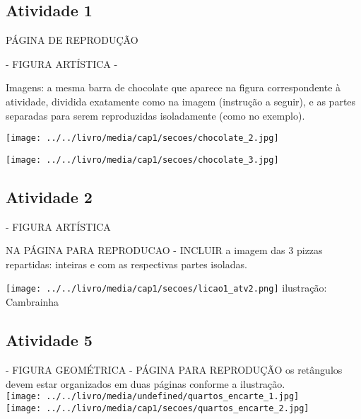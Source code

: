 \documentclass{book}
\begin{document}
\begin{multicols}{2}



\subsection{Atividade 1}


  \begin{imagem*}[breakable]{}{}
    PÁGINA DE REPRODUÇÃO

    - FIGURA ARTÍSTICA -

    Imagens: a mesma barra de chocolate que aparece na figura correspondente à atividade, dividida exatamente como na imagem (instrução a seguir), e as partes separadas para serem reproduzidas isoladamente (como no exemplo).

        \texttt{[image: ../../livro/media/cap1/secoes/chocolate\_2.jpg]}

        \texttt{[image: ../../livro/media/cap1/secoes/chocolate\_3.jpg]}
  \end{imagem*}


\subsection{Atividade 2}

  \begin{imagem*}[breakable]{}{}      - FIGURA ARTÍSTICA
    \begin{nota*}[breakable]{}{}       NA PÁGINA PARA REPRODUCAO - INCLUIR a imagem das 3 pizzas repartidas: inteiras e com as respectivas partes isoladas.
    \end{nota*}

        \texttt{[image: ../../livro/media/cap1/secoes/licao1\_atv2.png]}
    ilustração: Cambrainha

  \end{imagem*}

\subsection{Atividade 5}

  \begin{imagem*}[breakable]{}{}
    \begin{nota*}[breakable]{}{}       - FIGURA GEOMÉTRICA - PÁGINA PARA REPRODUÇÃO
      os retângulos devem estar organizados em duas páginas conforme a ilustração.
\\
      \texttt{[image: ../../livro/media/undefined/quartos\_encarte\_1.jpg]}
\\
      \texttt{[image: ../../livro/media/cap1/secoes/quartos\_encarte\_2.jpg]}
    \end{nota*}
  \end{imagem*}


\end{multicols}
\end{document}
